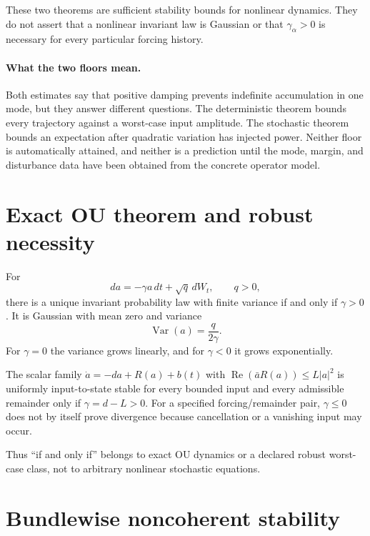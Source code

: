 \documentclass[11pt]{article}
\begin{document}
These two theorems are sufficient stability bounds for nonlinear dynamics.
They do not assert that a nonlinear invariant law is Gaussian or that
$\gamma_\alpha>0$ is necessary for every particular forcing history.

\paragraph{What the two floors mean.}
Both estimates say that positive damping prevents indefinite accumulation in
one mode, but they answer different questions.  The deterministic theorem
bounds every trajectory against a worst-case input amplitude.  The stochastic
theorem bounds an expectation after quadratic variation has injected power.
Neither floor is automatically attained, and neither is a prediction until
the mode, margin, and disturbance data have been obtained from the concrete
operator model.

\section{Exact OU theorem and robust necessity}

\begin{theorem}\label{thm:OU}
For
\[
da=-\gamma a\,dt+\sqrt q\,dW_t,
\qquad q>0,
\]
there is a unique invariant probability law with finite variance if and only if
$\gamma>0$. It is Gaussian with mean zero and variance
\[
\operatorname{Var}(a)=\frac{q}{2\gamma}.
\]
For $\gamma=0$ the variance grows linearly, and for $\gamma<0$ it grows
exponentially.
\end{theorem}

\begin{theorem}\label{thm:robust}
The scalar family
$\dot a=-da+R(a)+b(t)$ with
$\operatorname{Re}(\bar aR(a))\le L|a|^2$ is uniformly input-to-state stable
for every bounded input and every admissible remainder only if
$\gamma=d-L>0$. For a specified forcing/remainder pair,
$\gamma\le0$ does not by itself prove divergence because cancellation or a
vanishing input may occur.
\end{theorem}

Thus ``if and only if'' belongs to exact OU dynamics or a declared robust
worst-case class, not to arbitrary nonlinear stochastic equations.

\section{Bundlewise noncoherent stability}
\end{document}
